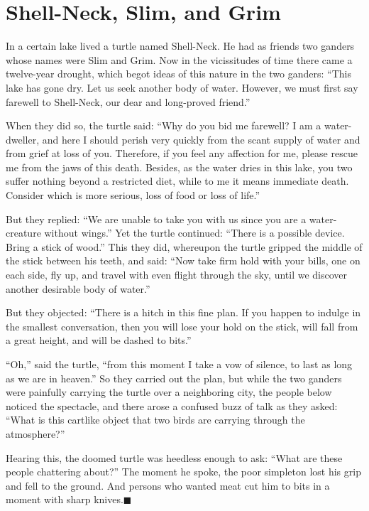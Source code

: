 \documentclass[article, twoside, 14pt]{memoir}
\newcommand{\qed}{\hfill \ensuremath{\blacksquare}}
\begin{document}
\chapter{Shell-Neck, Slim, and Grim}

\label{s19}

In a certain lake lived a turtle named Shell-Neck. He had as
friends two ganders whose names were Slim and Grim. Now in the
vicissitudes of time there came a twelve-year drought, which begot
ideas of this nature in the two ganders:
``This lake has gone dry. Let us seek another body of water. However, we must first say farewell to Shell-Neck, our dear and long-proved friend.''

When they did so, the turtle said:
``Why do you bid me farewell? I am a water-dweller, and here I should perish very quickly from the scant supply of water and from grief at loss of you. Therefore, if you feel any affection for me, please rescue me from the jaws of this death. Besides, as the water dries in this lake, you two suffer nothing beyond a restricted diet, while to me it means immediate death. Consider which is more serious, loss of food or loss of life.''

But they replied:
``We are unable to take you with us since you are a water-creature without wings.''
Yet the turtle continued:
``There is a possible device. Bring a stick of wood.'' This they
did, whereupon the turtle gripped the middle of the stick between
his teeth, and said:
``Now take firm hold with your bills, one on each side, fly up, and travel with even flight through the sky, until we discover another desirable body of water.''

But they objected:
``There is a hitch in this fine plan. If you happen to indulge in the smallest conversation, then you will lose your hold on the stick, will fall from a great height, and will be dashed to bits.''

``Oh,'' said the turtle,
``from this moment I take a vow of silence, to last as long as we are in heaven.''
So they carried out the plan, but while the two ganders were
painfully carrying the turtle over a neighboring city, the people
below noticed the spectacle, and there arose a confused buzz of
talk as they asked:
``What is this cartlike object that two birds are carrying through the atmosphere?''

Hearing this, the doomed turtle was heedless enough to ask:
``What are these people chattering about?'' The moment he spoke,
the poor simpleton lost his grip and fell to the ground. And
persons who wanted meat cut him to bits in a moment with sharp
knives.\hyperref[s19]{\qed}
\end{document}
